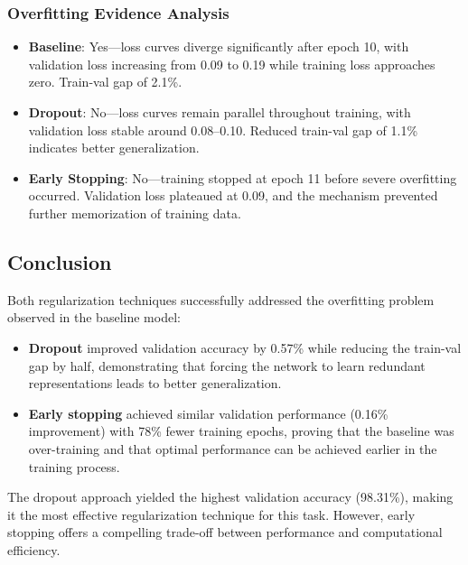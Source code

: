 \subsubsection{Overfitting Evidence Analysis}
\begin{itemize}
    \item \textbf{Baseline}: Yes---loss curves diverge significantly after epoch 10, with validation loss increasing from 0.09 to 0.19 while training loss approaches zero. Train-val gap of 2.1\%.
    
    \item \textbf{Dropout}: No---loss curves remain parallel throughout training, with validation loss stable around 0.08--0.10. Reduced train-val gap of 1.1\% indicates better generalization.
    
    \item \textbf{Early Stopping}: No---training stopped at epoch 11 before severe overfitting occurred. Validation loss plateaued at 0.09, and the mechanism prevented further memorization of training data.
\end{itemize}

\subsection{Conclusion}

Both regularization techniques successfully addressed the overfitting problem observed in the baseline model:

\begin{itemize}
    \item \textbf{Dropout} improved validation accuracy by 0.57\% while reducing the train-val gap by half, demonstrating that forcing the network to learn redundant representations leads to better generalization.
    
    \item \textbf{Early stopping} achieved similar validation performance (0.16\% improvement) with 78\% fewer training epochs, proving that the baseline was over-training and that optimal performance can be achieved earlier in the training process.
\end{itemize}

The dropout approach yielded the highest validation accuracy (98.31\%), making it the most effective regularization technique for this task. However, early stopping offers a compelling trade-off between performance and computational efficiency.